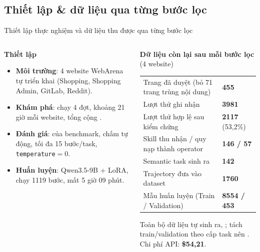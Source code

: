 \subsection{Thiết lập \& dữ liệu qua từng bước lọc}
\begin{frame}{Thiết lập thực nghiệm và dữ liệu thu được qua từng bước lọc}
  \begin{columns}[t]
    \begin{column}{0.46\textwidth}
      \footnotesize
      \textbf{Thiết lập}
      \begin{itemize}\setlength{\itemsep}{3pt}
        \item \textbf{Môi trường}: 4 website WebArena tự triển khai (Shopping, Shopping Admin, GitLab, Reddit).
        \item \textbf{Khám phá}: chạy 4 đợt, khoảng 21 giờ mỗi website, tổng cộng .
        \item \textbf{Đánh giá}:  của benchmark, chấm tự động, tối đa 15 bước/task, \texttt{temperature}$=0$.
        \item \textbf{Huấn luyện}: Qwen3.5-9B + LoRA, chạy 1119 bước, mất 5 giờ 09 phút.
      \end{itemize}
    \end{column}
    \begin{column}{0.54\textwidth}
      \footnotesize
      \textbf{Dữ liệu còn lại sau mỗi bước lọc} (4 website)
      \vspace{0.03cm}

      \scriptsize
      \begin{tabular}{@{}L{4.2cm} R{1.4cm}@{}}
        \toprule
        Trang đã duyệt (bỏ 71 trang trùng nội dung) & \textbf{455} \\
        Lượt thử ghi nhận & \textbf{3981} \\
        Lượt thử hợp lệ sau kiểm chứng & \textbf{2117} (53,2\%) \\
        \midrule
        Skill thu nhận / quy nạp thành operator & \textbf{146 / 57} \\
        Semantic task sinh ra & \textbf{142} \\
        \midrule
        Trajectory đưa vào dataset & \textbf{1760} \\
        Mẫu huấn luyện (Train / Validation) & \textbf{8554 / 453} \\
        \bottomrule
      \end{tabular}\par
      \vspace{0.08cm}
      {\scriptsize Toàn bộ dữ liệu tự sinh ra, ; tách train/validation theo cấp task nên . Chi phí API: \textbf{\$54,21}.}
    \end{column}
  \end{columns}
\end{frame}

